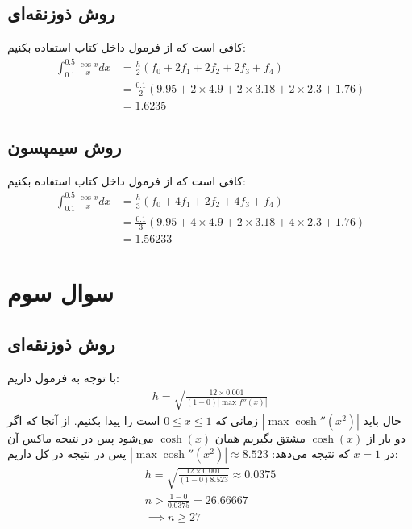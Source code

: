 \documentclass[]{article}
\begin{document}
\subsection*{روش ذوزنقه‌ای}
کافی است که از فرمول داخل کتاب استفاده بکنیم:
\begin{align*}
    \int_{0.1}^{0.5} \frac{\cos x}{x} dx &= \frac{h}{2} (f_0 + 2f_1 + 2f_2 + 2f_3 + f_4)\\
    &= \frac{0.1}{2} (9.95 + 2 \times 4.9 + 2 \times 3.18 + 2 \times 2.3 + 1.76)\\
    &= \boxed{1.6235}
\end{align*}
\subsection*{روش سیمپسون}
کافی است که از فرمول داخل کتاب استفاده بکنیم:
\begin{align*}
    \int_{0.1}^{0.5} \frac{\cos x}{x} dx &= \frac{h}{3} (f_0 + 4f_1 + 2f_2 + 4f_3 + f_4)\\
    &= \frac{0.1}{3} (9.95 + 4 \times 4.9 + 2 \times 3.18 + 4 \times 2.3 + 1.76)\\
    &= \boxed{1.56233}
\end{align*}
\section*{سوال سوم}
\subsection*{روش ذوزنقه‌ای}
با توجه به فرمول داریم:
\begin{gather*}
    h = \sqrt{\frac{12 \times 0.001}{(1 - 0) |\max f''(x)|}}
\end{gather*}
حال باید
$|\max \operatorname{cosh}''(x^2)|$
زمانی که
$0 \le x \le 1$
است را پیدا بکنیم. از آنجا که اگر دو بار از
$\operatorname{cosh}(x)$
مشتق بگیریم همان
$\operatorname{cosh}(x)$
می‌شود پس در نتیجه ماکس آن در
$x = 1$
که نتیجه می‌دهد:
$|\max \operatorname{cosh}''(x^2)| \approx 8.523$
پس در نتیجه در کل داریم:
\begin{gather*}
    h = \sqrt{\frac{12 \times 0.001}{(1 - 0) 8.523}} \approx 0.0375\\
    n > \frac{1 - 0}{0.0375} = 26.66667\\
    \implies \boxed{n \ge 27}
\end{gather*}
\end{document}
